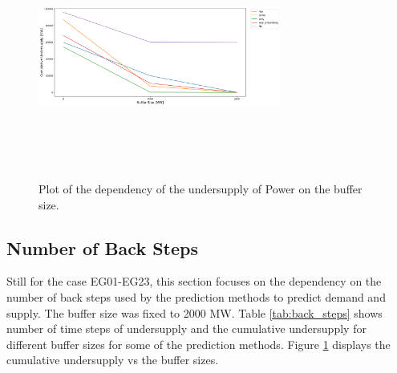 \documentclass[11pt,letterpaper]{article}
\begin{document}
\begin{figure}[h!]
	\centering
	\includegraphics[width=8cm,height=8cm,keepaspectratio]{23-buff.png}
	\caption{Plot of the dependency of the undersupply of Power on the buffer size.}
	\label{buffer_dep}
\end{figure}

\subsection{Number of Back Steps}

Still for the case EG01-EG23, this section focuses on the dependency on the number of back steps used by the prediction methods to predict demand and supply. The buffer size was fixed to 2000 MW. Table \ref{tab:back_steps} shows number of time steps of undersupply and the cumulative undersupply for different buffer sizes for some of the prediction methods. Figure \ref{buffer_dep} displays the cumulative undersupply vs the buffer sizes.
\end{document}
